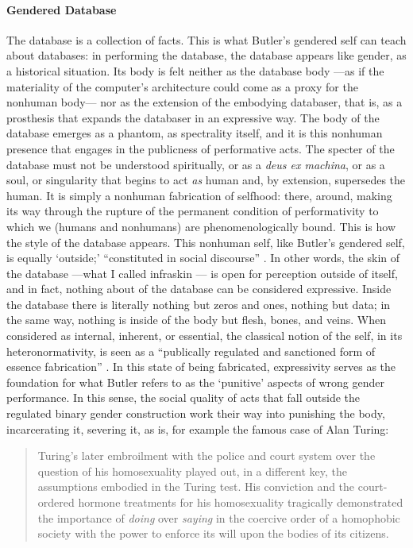 \paragraph{Gendered Database}
The database is a collection of facts. This is what Butler's gendered self can teach about databases: in performing the database, the database appears like gender, as a historical situation. Its body is felt neither as the database body ---as if the materiality of the computer's architecture could come as a proxy for the nonhuman body--- nor as the extension of the embodying databaser, that is, as a prosthesis that expands the databaser in an expressive way. The body of the database emerges as a phantom, as spectrality itself, and it is this nonhuman presence that engages in the publicness of performative acts. The specter of the database must not be understood spiritually, or as a \textit{deus ex machina}, or as a soul, or singularity that begins to act \textit{as} human and, by extension, supersedes the human. It is simply a nonhuman fabrication of selfhood: there, around, making its way through the rupture of the permanent condition of performativity to which we (humans and nonhumans) are phenomenologically bound. This is how the style of the database appears. This nonhuman self, like Butler's gendered self, is equally `outside;' ``constituted in social discourse'' \parencite[528]{But88:Per}. In other words, the skin of the database ---what I called infraskin --- is open for perception outside of itself, and in fact, nothing about of the database can be considered expressive. Inside the database there is literally nothing but zeros and ones, nothing but data; in the same way, nothing is inside of the body but flesh, bones, and veins. When considered as internal, inherent, or essential, the classical notion of the self, in its heteronormativity, is seen as a ``publically regulated and sanctioned form of essence fabrication'' \parencite[528]{But88:Per}. In this state of being fabricated, expressivity serves as the foundation for what Butler refers to as the `punitive' aspects of wrong gender performance. In this sense, the social quality of acts that fall outside the regulated binary gender construction work their way into punishing the body, incarcerating it, severing it, as is, for example the famous case of Alan Turing:

\begin{quote}
	Turing's later embroilment with the police and court system over the question of his homosexuality played out, in a different key, the assumptions embodied in the Turing test. His conviction and the court-ordered hormone treatments for his homosexuality tragically demonstrated the importance of \textit{doing} over \textit{saying} in the coercive order of a homophobic society with the power to enforce its will upon the bodies of its citizens. \parencite[xii]{Hay99:How}
\end{quote}
